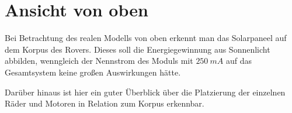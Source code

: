 \section{Ansicht von oben}
\label{sec:draufsicht}

Bei Betrachtung des realen Modells von oben erkennt man das Solarpaneel auf dem Korpus des Rovers.
Dieses soll die Energiegewinnung aus Sonnenlicht abbilden, wenngleich der Nennstrom des Moduls mit $250\ mA$ auf das Gesamtsystem keine großen Auswirkungen hätte.

Darüber hinaus ist hier ein guter Überblick über die Platzierung der einzelnen Räder und Motoren in Relation zum Korpus erkennbar.